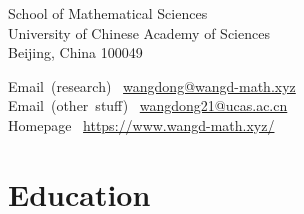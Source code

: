 
{\huge \name}


\bigskip

\begin{minipage}[t]{\englishaddresslength\textwidth}
  School of Mathematical Sciences \\
  University of Chinese Academy of Sciences \\
  Beijing, China 100049 \\
\end{minipage}
\begin{minipage}[t]{\chineseaddresslength\textwidth}
  \begin{flushright}
  \end{flushright}
\end{minipage}
\begin{minipage}[t]{\emaillength\linewidth}
  \mbox{Email (research) }  \mbox{\href{mailto:wangdong@wangd-math.xyz}{wangdong@wangd-math.xyz}} \\
  \mbox{Email (other stuff) }  \mbox{\href{mailto:wangdong21@ucas.ac.cn}{wangdong21@ucas.ac.cn}} \\
  \mbox{Homepage }  \mbox{\href{https://www.wangd-math.xyz/}{{https://www.wangd-math.xyz/}}}
\end{minipage}
\section*{Education }

